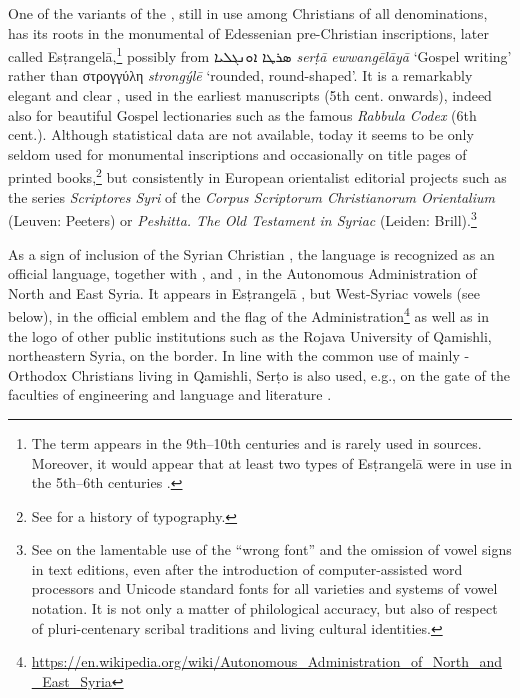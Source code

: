 \documentclass[output=paper,colorlinks,citecolor=brown,arabfont,syriacfont]{langscibook}
\begin{document}
One of the variants of the  , still in use among  Christians of all denominations, has its roots in the monumental  of Edessenian pre-Christian inscriptions, later called Esṭrangelā,\footnote{%
The term appears in the 9th--10th centuries and is rarely used in  sources. Moreover, it would appear that at least two types of Esṭrangelā were in use in the 5th--6th centuries \citep[220]{borbone2021}.} possibly from  \textsyriac{ܣܪܛܐ ܐܘܢܓܠܝܐ} \textit{serṭā ewwangēlāyā} `Gospel writing' rather than  στρογγύλη \textit{strongýlē} `rounded, round-shaped'.
It is a remarkably elegant and clear , used in the earliest  manuscripts (5th cent. onwards), indeed also for beautiful Gospel lectionaries such as the famous \textit{Rabbula Codex} (6th cent.). Although statistical data are not available, today it seems to be only seldom used for monumental inscriptions and occasionally on title pages of printed books,\footnote{%
See \citet{coakley2006} for a history of  typography.} but consistently in European orientalist editorial projects such as the series \textit{Scriptores Syri} of the \textit{Corpus Scriptorum Christianorum Orientalium} (Leuven: Peeters) or \textit{Peshitta. The Old Testament in Syriac} (Leiden: Brill).\footnote{%
See \citet{mengozzi2015} on the lamentable use of the ``wrong font'' and the omission of vowel signs in  text editions, even after the introduction of computer-assisted word processors and Unicode standard fonts for all  varieties and systems of vowel notation. It is not only a matter of philological accuracy, but also of respect of pluri-centenary scribal traditions and living cultural identities.}

As a sign of inclusion of the Syrian Christian , the  language is recognized as an official language, together with  ,  and , in the Autonomous Administration of North and East Syria. It appears in Esṭrangelā , but West-Syriac vowels (see below), in the official emblem and the flag of the Administration\footnote{%
\url{https://en.wikipedia.org/wiki/Autonomous_Administration_of_North_and_East_Syria}} as well as in the logo of other public institutions such as the Rojava University of Qamishli, northeastern Syria, on the  border. In line with the common use of mainly -Orthodox Christians living in Qamishli, Serṭo  is also used, e.g., on the gate of the faculties of engineering and  language and literature \citep{samir2019}.
\end{document}
